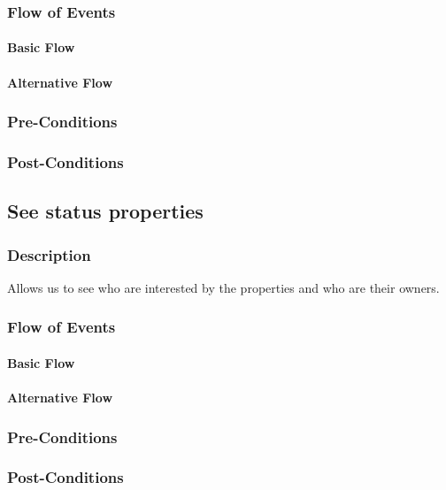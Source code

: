\documentclass[a4paper,12pt]{article}
\begin{document}
\subsubsection{Flow of Events}
\paragraph{Basic Flow}
\begin{itemize}
\end{itemize}

\paragraph{Alternative Flow}
\begin{itemize}
\end{itemize}

\subsubsection{Pre-Conditions}
\subsubsection{Post-Conditions}

\subsection{See status properties}
\subsubsection{Description}
Allows us to see who are interested by the properties and who are their owners.
\subsubsection{Flow of Events}
\paragraph{Basic Flow}
\begin{itemize}
\end{itemize}

\paragraph{Alternative Flow}
\begin{itemize}
\end{itemize}

\subsubsection{Pre-Conditions}
\subsubsection{Post-Conditions}

 
\end{document}
